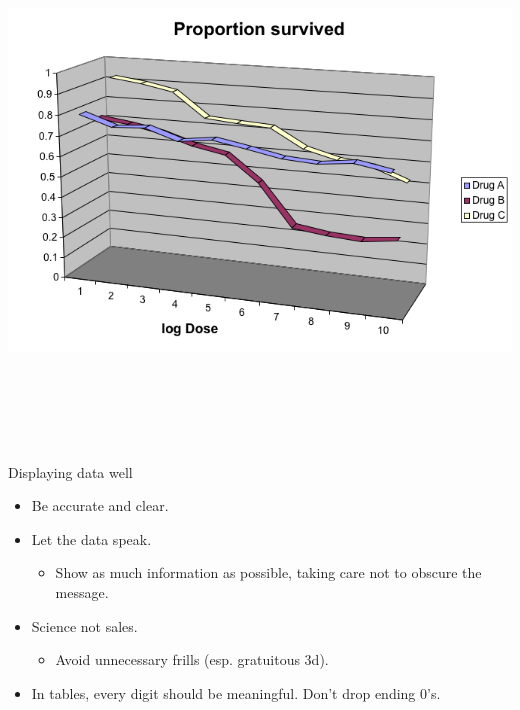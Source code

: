 \documentclass[12pt]{article}
\newcommand{\headsize}{\fontsize{35}{35} \selectfont}
\newcommand{\smallsize}{\fontsize{25}{30} \selectfont}
\newcommand{\smallersize}{\fontsize{20}{25} \selectfont}
\begin{document}
\centerline{\includegraphics[height=5.5in]{Figs/fig8b.png}}




\newpage

\headsize \color{myyellow}
\hfill \begin{minipage}{5.75in}
\centering
Displaying data well
\end{minipage}

\vspace{30mm}
\smallsize \color{mywhite}

\hspace{0.5in} \begin{minipage}[t]{9in}
\begin{itemize}

\itemsep24pt

\item Be accurate and clear.

\item Let the data speak.

{\color{myblue} \smallersize
\begin{itemize}
\item Show as much information as possible, taking care not to
  obscure the message.
\end{itemize} }

\item Science not sales.

{\color{myblue} \smallersize
\begin{itemize}
\item Avoid unnecessary frills (esp. gratuitous 3d).
\end{itemize} }

\item In tables, every digit should be meaningful. Don't drop ending 0's.

\end{itemize}
\end{minipage}
\end{document}
